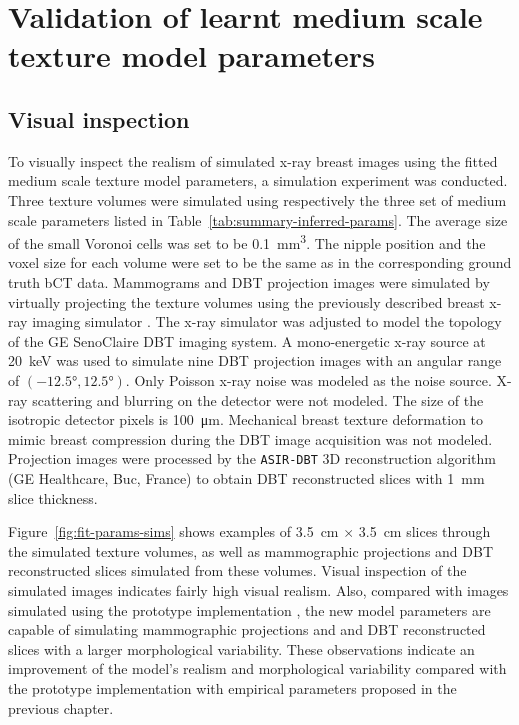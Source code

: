 \documentclass[journal]{IEEEtran}
\begin{document}
\section{Validation of learnt medium scale texture model parameters}
\label{sec:valid-inferr-medi}

\subsection{Visual inspection}
\label{sec:visual-validation-1}

To visually inspect the realism of simulated x-ray breast images using
the fitted medium scale texture model parameters, a simulation
experiment was conducted. Three texture volumes were simulated using
respectively the three set of medium scale parameters listed in
Table~\ref{tab:summary-inferred-params}. The average size of the small
Voronoi cells was set to be \SI{0.1}{\mm\cubed}. The nipple position
and the voxel size for each volume were set to be the same as in the
corresponding ground truth bCT data. Mammograms and DBT projection
images were simulated by virtually projecting the texture volumes
using the previously described breast x-ray imaging simulator
\cite{milioni2014low}. The x-ray simulator was adjusted to model the
topology of the GE SenoClaire DBT imaging system. A mono-energetic
x-ray source at \SI{20}{\keV} was used to simulate nine DBT projection
images with an angular range of $( \ang{-12.5}, \ang{12.5} )$. Only
Poisson x-ray noise was modeled as the noise source. X-ray scattering
and blurring on the detector were not modeled. The size of the
isotropic detector pixels is \SI{100}{\um}. Mechanical breast texture
deformation to mimic breast compression during the DBT image
acquisition was not modeled. Projection images were processed by the
\texttt{ASIR-DBT} 3D reconstruction algorithm (GE Healthcare, Buc,
France) to obtain DBT reconstructed slices with \SI{1}{\mm} slice
thickness.

Figure~\ref{fig:fit-params-sims} shows examples of \SI{3.5}{\cm}
$\times$ \SI{3.5}{\cm} slices through the simulated texture volumes,
as well as mammographic projections and DBT reconstructed slices
simulated from these volumes. Visual inspection of the simulated
images indicates fairly high visual realism. Also, compared with
images simulated using the prototype implementation
\cite{li2016novel}, the new model parameters are capable of simulating
mammographic projections and and DBT reconstructed slices with a
larger morphological variability. These observations indicate an
improvement of the model's realism and morphological variability
compared with the prototype implementation with empirical parameters
proposed in the previous chapter.
\end{document}

